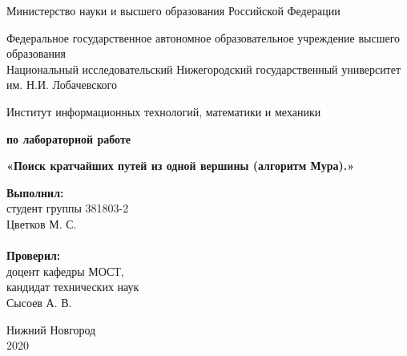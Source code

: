 \documentclass{report}
\begin{document}
\begin{titlepage}

\begin{center}
Министерство науки и высшего образования Российской Федерации
\end{center}

\begin{center}
Федеральное государственное автономное образовательное учреждение высшего образования \\
Национальный исследовательский Нижегородский государственный университет им. Н.И. Лобачевского
\end{center}

\begin{center}
Институт информационных технологий, математики и механики
\end{center}

\vspace{4em}

\begin{center}
\textbf{ по лабораторной работе} \\
\end{center}
\begin{center}
\textbf{\Large«Поиск кратчайших путей из одной вершины (алгоритм Мура).»} \\
\end{center}

\vspace{4em}

\newbox{\lbox}
\newlength{\maxl}
\setlength{\maxl}{\wd\lbox}
\hfill\parbox{7cm}{
\hspace*{5cm}\hspace*{-5cm}\textbf{Выполнил:} \\ студент группы 381803-2 \\ Цветков М. С.\\
\\
\hspace*{5cm}\hspace*{-5cm}\textbf{Проверил:}\\ доцент кафедры МОСТ, \\ кандидат технических наук \\ Сысоев А. В. \\
}
\vspace{\fill}

\begin{center} Нижний Новгород \\ 2020 \end{center}

\end{titlepage}
\end{document}
